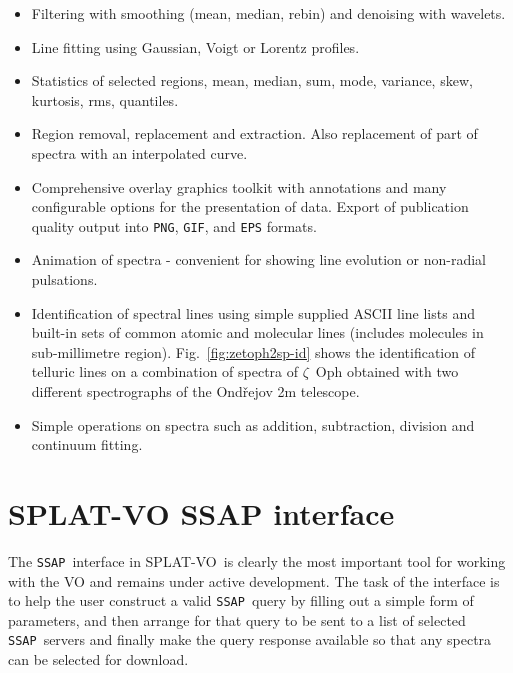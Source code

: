 \documentclass[final,authoryear,5p,times,twocolumn]{elsarticle}
\newcommand{\ssap}{\texttt{SSAP}}
\newcommand{\splatvo}{{\textsf{\small{SPLAT-VO}}}}
\begin{document}
\begin{itemize}
\item Filtering with smoothing (mean, median, rebin) and denoising with wavelets.

\item Line fitting using Gaussian, Voigt or Lorentz profiles.

\item Statistics of selected regions, mean, median, sum, mode, variance, skew,
      kurtosis, rms, quantiles.

\item Region removal, replacement and extraction. Also replacement of part of
 spectra with an interpolated curve.

\item Comprehensive overlay graphics toolkit with annotations and many
  configurable options for the presentation of data. Export of publication quality
  output into \texttt{PNG}, \texttt{GIF}, and \texttt{EPS} formats.

\item Animation of spectra - convenient for showing line evolution or
  non-radial pulsations.

\item Identification of spectral lines using simple supplied ASCII line lists
  and built-in sets of common atomic and molecular lines (includes molecules in
  sub-millimetre region). Fig.~\ref{fig:zetoph2sp-id} shows the identification
  of telluric lines on a combination of spectra of $\zeta$~Oph obtained with
  two different spectrographs of the Ond\v{r}ejov 2m telescope.

\item Simple operations on spectra such as addition, subtraction, division and
  continuum fitting.

\end{itemize}


\section{SPLAT-VO SSAP interface}

The \ssap\ interface in \splatvo\ is clearly the most important tool for working
with the VO and remains under active development. The task of the interface is
to help the user construct a valid \ssap\ query by filling out a simple form of
parameters, and then arrange for that query to be sent to a list of selected
\ssap\ servers and finally make the query response available so that any spectra
can be selected for download.
\end{document}
